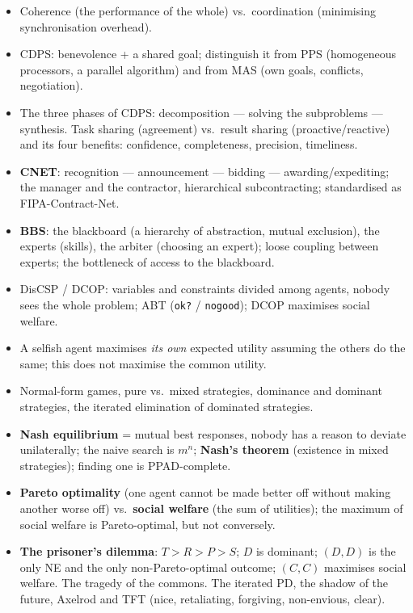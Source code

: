 \documentclass[11pt,a4paper]{article}
\theoremstyle{definition}
\begin{document}
\begin{itemize}
\item Coherence (the performance of the whole) vs.\ coordination (minimising synchronisation
  overhead).
\item CDPS: benevolence + a shared goal; distinguish it from PPS (homogeneous processors, a
  parallel algorithm) and from MAS (own goals, conflicts, negotiation).
\item The three phases of CDPS: decomposition --- solving the subproblems --- synthesis. Task
  sharing (agreement) vs.\ result sharing (proactive/reactive) and its four benefits:
  confidence, completeness, precision, timeliness.
\item \textbf{CNET}: recognition --- announcement --- bidding --- awarding/expediting; the
  manager and the contractor, hierarchical subcontracting; standardised as FIPA-Contract-Net.
\item \textbf{BBS}: the blackboard (a hierarchy of abstraction, mutual exclusion), the experts
  (skills), the arbiter (choosing an expert); loose coupling between experts; the bottleneck of
  access to the blackboard.
\item DisCSP / DCOP: variables and constraints divided among agents, nobody sees the whole
  problem; ABT (\texttt{ok?} / \texttt{nogood}); DCOP maximises social welfare.
\item A selfish agent maximises \emph{its own} expected utility assuming the others do the same;
  this does not maximise the common utility.
\item Normal-form games, pure vs.\ mixed strategies, dominance and dominant strategies, the
  iterated elimination of dominated strategies.
\item \textbf{Nash equilibrium} = mutual best responses, nobody has a reason to deviate
  unilaterally; the naive search is $m^n$; \textbf{Nash's theorem} (existence in mixed
  strategies); finding one is PPAD-complete.
\item \textbf{Pareto optimality} (one agent cannot be made better off without making another
  worse off) vs.\ \textbf{social welfare} (the sum of utilities); the maximum of social welfare
  is Pareto-optimal, but not conversely.
\item \textbf{The prisoner's dilemma}: $T>R>P>S$; $D$ is dominant; $(D,D)$ is the only NE and
  the only non-Pareto-optimal outcome; $(C,C)$ maximises social welfare. The tragedy of the
  commons. The iterated PD, the shadow of the future, Axelrod and TFT (nice, retaliating,
  forgiving, non-envious, clear).

\end{itemize}
\end{document}
